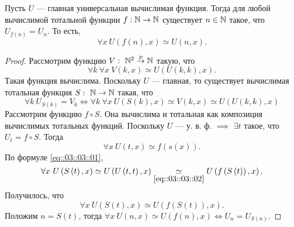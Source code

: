 \begin{theorem}[Клини]
    Пусть $U$ --- главная универсальная вычислимая функция.
    Тогда для любой вычислимой тотальной функции $f: \mathbb{N} \to \mathbb{N}$ существует $n \in \mathbb{N}$ такое, что $U_{f\left(n\right)} = U_{n}$.
    То есть,
    $$
        \forall x~ U\left(f\left(n\right), x\right) \simeq U\left(n, x\right).
    $$
\end{theorem}
\begin{proof}
    Рассмотрим функцию $V:~\mathbb{N}^{2} \overset{p}{\to} \mathbb{N}$ такую, что
    $$
        \forall k~ \forall x~ V\left(k, x\right) \simeq U\left(U\left(k, k\right), x\right).
    $$
    Такая функция вычислима.
    Поскольку $U$ --- главная, то существует вычислимая тотальная функция $S:~\mathbb{N} \to \mathbb{N}$ такая, что
    \begin{equation} \label{eq::03::03::01}
        \forall k~U_{S\left(k\right)} = V_{k} \iff \forall k~\forall x~U\left(S\left(k\right), x\right) \simeq V\left(k, x\right) \simeq U\left(U\left(k, k\right), x\right)
    \end{equation}
    Рассмотрим функцию $f \circ S$.
    Она вычислима и тотальная как композиция вычислимых тотальных функций.
    Поскольку $U$ --- у. в. ф. $\implies$ $\exists t$ такое, что $U_{t} = f \circ S$.
    Тогда
    \begin{equation} \label{eq::03::03::02}
        \forall x~U\left(t, x\right) \simeq f\left(s\left(x\right)\right).
    \end{equation}
    По формуле \eqref{eq::03::03::01}, 
    \begin{equation}
        \forall x~U\left(S\left(t\right), x\right) \simeq U\left(U\left(t, t\right), x\right) \underset{\eqref{eq::03::03::02}}{\simeq} U\left(f\left(S\left(t\right)\right), x\right).
    \end{equation}
    Получилось, что
    $$
        \forall x~ U\left(S\left(t\right), x\right) \simeq U\left(f\left(S\left(t\right)\right), x\right).
    $$
    Положим $n = S\left(t\right)$, тогда $\forall x~ U\left(n, x\right) \simeq U\left(f\left(n\right), x\right) \iff U_{n} = U_{S\left(n\right)}$.
\end{proof}
